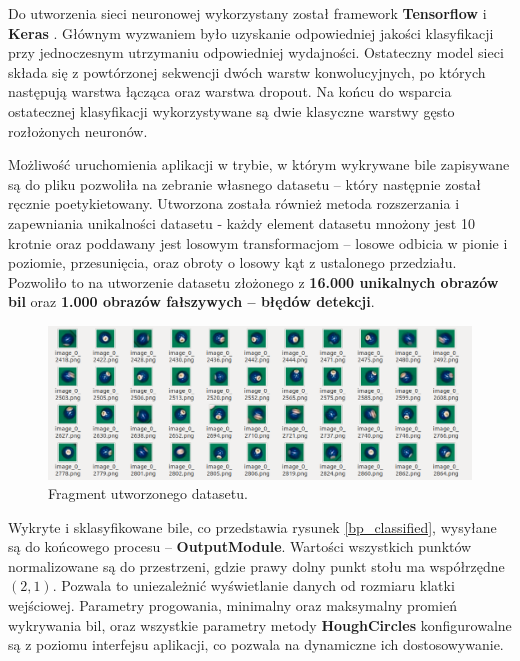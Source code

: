 \documentclass[12pt]{article}
\begin{document}
    
    Do utworzenia sieci neuronowej wykorzystany został framework \textbf{Tensorflow} \cite{TensorFlow} i \textbf{Keras} \cite{keras}. Głównym wyzwaniem było uzyskanie odpowiedniej jakości klasyfikacji przy jednoczesnym utrzymaniu odpowiedniej wydajności.
    Ostateczny model sieci składa się z powtórzonej sekwencji dwóch warstw konwolucyjnych, po których następują warstwa łącząca oraz warstwa dropout. Na końcu do wsparcia ostatecznej klasyfikacji wykorzystywane są dwie klasyczne warstwy gęsto rozłożonych neuronów. 
    
    
    Możliwość uruchomienia aplikacji w trybie, w którym wykrywane bile zapisywane są do pliku pozwoliła na zebranie własnego datasetu – który następnie został ręcznie poetykietowany. Utworzona została również metoda rozszerzania i zapewniania unikalności datasetu - każdy element datasetu mnożony jest 10 krotnie oraz poddawany jest losowym transformacjom – losowe odbicia w pionie i poziomie, przesunięcia, oraz obroty o losowy kąt z ustalonego przedziału. Pozwoliło to na utworzenie datasetu złożonego z \textbf{16.000 unikalnych obrazów bil} oraz \textbf{1.000 obrazów fałszywych – błędów detekcji}.

    \begin{figure}[!htb]
       \centering
       \includegraphics[width=15cm]{./images/obrazki/klasyfikacja/augmented_data.png}
       \caption{Fragment utworzonego datasetu.}
       \label{dataset}
    \end{figure}

    
    Wykryte i sklasyfikowane bile, co przedstawia rysunek \ref{bp_classified}, wysyłane są do końcowego procesu – \textbf{OutputModule}. Wartości wszystkich punktów normalizowane są do przestrzeni, gdzie prawy dolny punkt stołu ma współrzędne $(2, 1)$. Pozwala to uniezależnić wyświetlanie danych od rozmiaru klatki wejściowej. Parametry progowania, minimalny oraz maksymalny promień wykrywania bil, oraz wszystkie parametry metody \textbf{HoughCircles} konfigurowalne są z poziomu interfejsu aplikacji, co pozwala na dynamiczne ich dostosowywanie.
\end{document}

